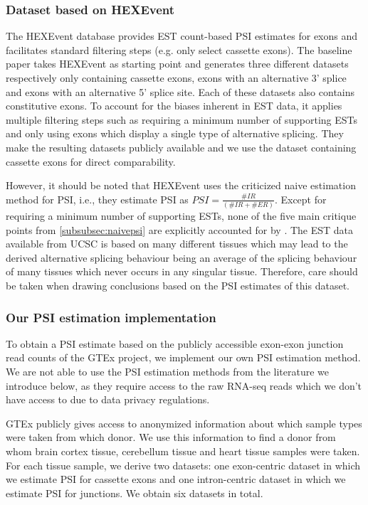 \subsubsection{Dataset based on HEXEvent}
The HEXEvent database provides EST count-based PSI estimates for exons and facilitates standard filtering steps (e.g. only select cassette exons). 
The baseline paper \cite{dsc} takes HEXEvent as starting point and generates three different datasets respectively only containing cassette exons, exons with an alternative 3' splice and exons with an alternative 5' splice site. Each of these datasets also contains constitutive exons. To account for the biases inherent in EST data, it applies multiple filtering steps such as requiring a minimum number of supporting ESTs and only using exons which display a single type of alternative splicing. They make the resulting datasets publicly available and we use the dataset containing cassette exons for direct comparability. 

However, it should be noted that HEXEvent uses the criticized naive estimation method for PSI, i.e., they estimate PSI as $PSI = \frac{\#IR}{(\#IR+\#ER)}$. Except for requiring a minimum number of supporting ESTs, none of the five main critique points from \ref{subsubsec:naivepsi} are explicitly accounted for by \cite{dsc}. The EST data available from UCSC is based on many different tissues which may lead to the derived alternative splicing behaviour being an average of the splicing behaviour of many tissues which never occurs in any singular tissue. %
Therefore, care should be taken when drawing conclusions based on the PSI estimates of this dataset. 

\subsubsection{Our PSI estimation implementation} \label{subsubsec:implementedpsiestimation}
To obtain a PSI estimate based on the publicly accessible exon-exon junction read counts of the GTEx project, we implement our own PSI estimation method. We are not able to use the PSI estimation methods from the literature we introduce below, as they require access to the raw RNA-seq reads which we don't have access to due to data privacy regulations.

GTEx publicly gives access to anonymized information about which sample types were taken from which donor. We use this information to find a donor from whom brain cortex tissue, cerebellum tissue and heart tissue samples were taken. For each tissue sample, we derive two datasets: one exon-centric dataset in which we estimate PSI for cassette exons and one intron-centric dataset in which we estimate PSI for junctions. 
We obtain six datasets in total.

